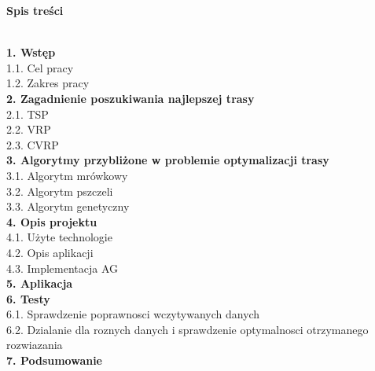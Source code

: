 \documentclass[a4paper, twoside, 12pt, justified]{article}
\begin{document}
	\begin{flushleft}
		\begin{large}\textbf{Spis treści}\end{large}
		\vspace{5mm}\\
		\textbf{1. Wstęp }\\
			\hspace{5mm}1.1. Cel pracy\\
			\hspace{5mm}1.2. Zakres pracy\\
		\textbf{2. Zagadnienie poszukiwania najlepszej trasy }\\
			\hspace{5mm}2.1. TSP\\
			\hspace{5mm}2.2. VRP\\
			\hspace{5mm}2.3. CVRP\\
		\textbf{3. Algorytmy przybliżone w problemie
			optymalizacji trasy }\\
			\hspace{5mm}3.1. Algorytm mrówkowy\\
			\hspace{5mm}3.2. Algorytm pszczeli\\
			\hspace{5mm}3.3. Algorytm genetyczny\\
		\textbf{4. Opis projektu}\\
			\hspace{5mm}4.1. Użyte technologie\\
			\hspace{5mm}4.2. Opis aplikacji\\
			\hspace{5mm}4.3. Implementacja AG\\
		\textbf{5. Aplikacja}\\
		\textbf{6. Testy}\\
			\hspace{5mm}6.1. Sprawdzenie poprawnosci wczytywanych danych\\
			\hspace{5mm}6.2. Dzialanie dla roznych danych i sprawdzenie optymalnosci otrzymanego rozwiazania\\
		\textbf{7. Podsumowanie}\\
		
	\end{flushleft}
	\newpage
	
		
\end{document}

